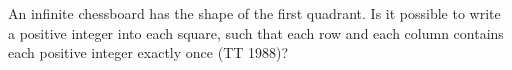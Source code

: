 An infinite chessboard has the shape of the first quadrant. Is it possible to write a positive integer into each square, such that each row and each column contains each positive integer exactly once (TT 1988)?
